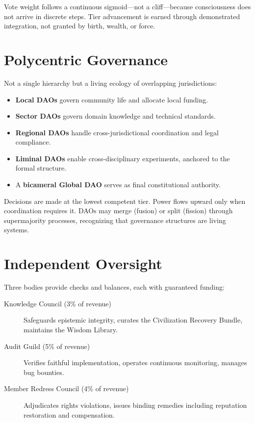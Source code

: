 \documentclass[12pt]{book}
\begin{document}
Vote weight follows a continuous sigmoid---not a cliff---because consciousness does
not arrive in discrete steps. Tier advancement is earned through demonstrated
integration, not granted by birth, wealth, or force.

\section*{Polycentric Governance}

Not a single hierarchy but a living ecology of overlapping jurisdictions:

\begin{itemize}
  \item \textbf{Local DAOs} govern community life and allocate local funding.
  \item \textbf{Sector DAOs} govern domain knowledge and technical standards.
  \item \textbf{Regional DAOs} handle cross-jurisdictional coordination and legal compliance.
  \item \textbf{Liminal DAOs} enable cross-disciplinary experiments, anchored to the formal structure.
  \item A \textbf{bicameral Global DAO} serves as final constitutional authority.
\end{itemize}

Decisions are made at the lowest competent tier. Power flows upward only when
coordination requires it. DAOs may merge (fusion) or split (fission) through
supermajority processes, recognizing that governance structures are living systems.

\section*{Independent Oversight}

Three bodies provide checks and balances, each with guaranteed funding:

\begin{description}
  \item[Knowledge Council (3\% of revenue)] Safeguards epistemic integrity, curates
    the Civilization Recovery Bundle, maintains the Wisdom Library.
  \item[Audit Guild (5\% of revenue)] Verifies faithful implementation, operates
    continuous monitoring, manages bug bounties.
  \item[Member Redress Council (4\% of revenue)] Adjudicates rights violations,
    issues binding remedies including reputation restoration and compensation.
\end{description}
\end{document}
